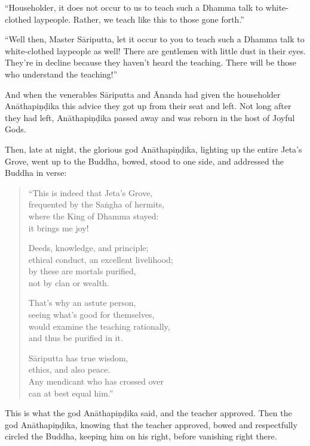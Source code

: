 \documentclass[12pt,openany]{book}%
\begin{document}
“Householder, it does not occur to us to teach such a Dhamma talk to white-clothed laypeople. Rather, we teach like this to those gone forth.” 

“Well then, Master \textsanskrit{Sāriputta}, let it occur to you to teach such a Dhamma talk to white-clothed laypeople as well! There are gentlemen with little dust in their eyes. They’re in decline because they haven’t heard the teaching. There will be those who understand the teaching!” 

And when the venerables \textsanskrit{Sāriputta} and Ānanda had given the householder \textsanskrit{Anāthapiṇḍika} this advice they got up from their seat and left. Not long after they had left, \textsanskrit{Anāthapiṇḍika} passed away and was reborn in the host of Joyful Gods. 

Then, late at night, the glorious god \textsanskrit{Anāthapiṇḍika}, lighting up the entire Jeta’s Grove, went up to the Buddha, bowed, stood to one side, and addressed the Buddha in verse: 

\begin{verse}%
“This is indeed that Jeta’s Grove, \\
frequented by the \textsanskrit{Saṅgha} of hermits, \\
where the King of Dhamma stayed: \\
it brings me joy! 

Deeds, knowledge, and principle; \\
ethical conduct, an excellent livelihood; \\
by these are mortals purified, \\
not by clan or wealth. 

That’s why an astute person, \\
seeing what’s good for themselves, \\
would examine the teaching rationally, \\
and thus be purified in it. 

\textsanskrit{Sāriputta} has true wisdom, \\
ethics, and also peace. \\
Any mendicant who has crossed over \\
can at best equal him.” 

%
\end{verse}

This is what the god \textsanskrit{Anāthapiṇḍika} said, and the teacher approved. Then the god \textsanskrit{Anāthapiṇḍika}, knowing that the teacher approved, bowed and respectfully circled the Buddha, keeping him on his right, before vanishing right there. 
\end{document}

